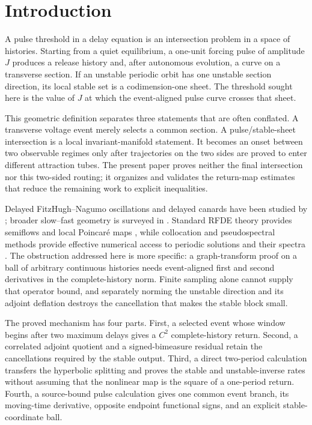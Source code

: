 \section{Introduction}\label{sec:introduction}

A pulse threshold in a delay equation is an intersection problem in a space
of histories.  Starting from a quiet equilibrium, a one-unit forcing pulse of
amplitude \(J\) produces a release history and, after autonomous evolution, a
curve on a transverse section.  If an unstable periodic orbit has one
unstable section direction, its local stable set is a codimension-one sheet.
The threshold sought here is the value of \(J\) at which the event-aligned
pulse curve crosses that sheet.

This geometric definition separates three statements that are often conflated.
A transverse voltage event merely selects a common section.  A
pulse/stable-sheet intersection is a local invariant-manifold statement.  It
becomes an onset between two observable regimes only after trajectories on
the two sides are proved to enter different attraction tubes.  The present
paper proves neither the final intersection nor this two-sided routing; it
organizes and validates the return-map estimates that reduce the remaining
work to explicit inequalities.

Delayed FitzHugh--Nagumo oscillations and delayed canards have been studied by
\citet{campbell2009delay,krupa2016complex,krupa2016explosion}; broader
slow--fast geometry is surveyed in
\citet{wechselberger2012canards,desroches2012mixed}.  Standard RFDE theory
provides semiflows and local Poincar\'e maps
\citep{hale1993introduction,diekmann1995delay}, while collocation and
pseudospectral methods provide effective numerical access to periodic
solutions and their spectra
\citep{engelborghs2001collocation,engelborghs2002ddebiftool,
ando2020collocation,dewolff2021pseudospectral}.  The obstruction addressed
here is more specific: a graph-transform proof on a ball of arbitrary
continuous histories needs event-aligned first and second derivatives in the
complete-history norm.  Finite sampling alone cannot supply that operator
bound, and separately norming the unstable direction and its adjoint
deflation destroys the cancellation that makes the stable block small.

The proved mechanism has four parts.  First, a selected event whose window
begins after two maximum delays gives a \(C^2\) complete-history return.
Second, a correlated adjoint quotient and a signed-bimeasure residual retain
the cancellations required by the stable output.  Third, a direct
two-period calculation transfers the hyperbolic splitting and proves the
stable and unstable-inverse rates without assuming that the nonlinear map is
the square of a one-period return.  Fourth, a source-bound pulse calculation
gives one common event branch, its moving-time derivative, opposite endpoint
functional signs, and an explicit stable-coordinate ball.

